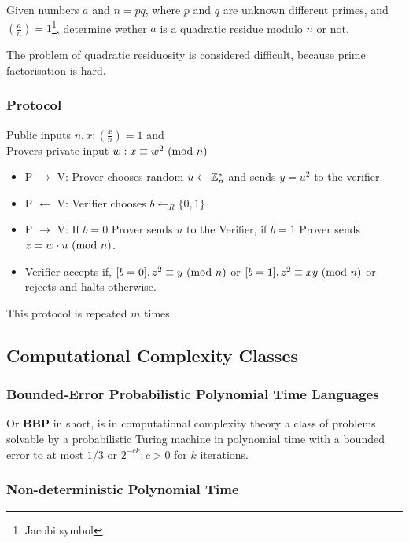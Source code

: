 Given numbers $a$ and $n = pq$, where $p$ and $q$ are unknown different primes, and $(\frac{a}{n}) = 1$\footnote{Jacobi symbol}, determine wether $a$ is a quadratic residue modulo $n$ or not.

\bigskip

The problem of quadratic residuosity is considered difficult, because prime factorisation is hard.

\subsubsection*{Protocol}

Public inputs $n,x: (\frac{x}{n}) = 1$ and\\
Provers private input $w: x \equiv w^2 \ (\mathrm{mod}\ n)$\\

\begin{itemize}
	\item P $\rightarrow$ V: Prover chooses random  $u \leftarrow \Bbb{Z}_{n}^{*}$ and sends $y = u^2$ to the verifier.
	\item P $\leftarrow$ V: Verifier chooses $b \leftarrow_R \{0, 1\} $
	\item P $\rightarrow$ V: If $b = 0$ Prover sends $u$ to the Verifier, if $b = 1$ Prover sends $z = w \cdot u \ (\mathrm{mod}\ n)$.
	\item Verifier accepts if, $[b = 0], z^2 \equiv y \ (\mathrm{mod}\ n)$ or $[b = 1], z^2 \equiv xy \ (\mathrm{mod}\ n)$ or rejects and halts otherwise.
\end{itemize}

This protocol is repeated $m$ times.


\subsection{Computational Complexity Classes}
\subsubsection{Bounded-Error Probabilistic Polynomial Time Languages 
}
Or \textbf{BBP} in short, is in computational complexity theory a class of problems solvable by a probabilistic Turing machine in polynomial time with a bounded error to at most $1/3$ or $2^{-ck}; c>0$ for $k$ iterations.

\subsubsection{Non-deterministic Polynomial Time}

